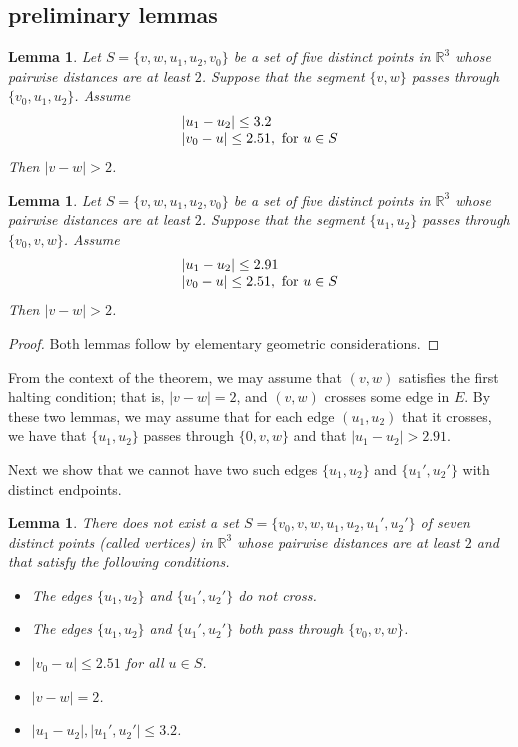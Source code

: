 \documentclass[11pt]{amsart}
\newcommand{\ring}[1]{\mathbb{#1}}
\def\text{\hbox}
\newtheorem{lemma}[subsubsection]{Lemma}
\begin{document}
\subsection*{preliminary lemmas}

\begin{lemma}  Let $S=\{v,w,u_1,u_2,v_0\}$ be a set of five distinct points in $\ring{R}^3$ whose
pairwise distances are at least $2$. Suppose that the segment $\{v,w\}$ passes through
$\{v_0,u_1,u_2\}$. Assume
$$
\begin{array}{lll}
|u_1-u_2|\le 3.2\\
|v_0-u|\le 2.51,\text{ for } u \in S\\
\end{array}
$$
Then $|v-w|>2$.
\end{lemma}

\begin{lemma}  Let $S=\{v,w,u_1,u_2,v_0\}$ be a set of five distinct points in $\ring{R}^3$ whose
pairwise distances are at least $2$. Suppose that the segment $\{u_1,u_2\}$ passes through
$\{v_0,v,w\}$. Assume
$$
\begin{array}{lll}
|u_1-u_2|\le 2.91\\
|v_0-u|\le 2.51,\text{ for } u \in S\\
\end{array}
$$
Then $|v-w|>2$.
\end{lemma}



\begin{proof} Both lemmas follow by elementary geometric considerations.
\end{proof}

From the context of the theorem, we may assume that $(v,w)$ satisfies the first halting condition;
that is, $|v-w|=2$, and $(v,w)$ crosses some edge in $E$.
By these two lemmas, we may assume that for each edge $(u_1,u_2)$ that it crosses,
we have that $\{u_1,u_2\}$ passes through $\{0,v,w\}$ and that $|u_1-u_2|>2.91$.

Next we show that we cannot have two such edges $\{u_1,u_2\}$ and $\{u_1',u_2'\}$ with distinct endpoints.

\begin{lemma} There does not exist a set $S=\{v_0,v,w,u_1,u_2,u_1',u_2'\}$ of seven distinct points (called vertices)
in $\ring{R}^3$ whose pairwise distances are at least $2$ and that satisfy the following conditions.
\begin{itemize}
\item The edges $\{u_1,u_2\}$ and $\{u_1',u_2'\}$ do not cross.
\item The edges $\{u_1,u_2\}$ and $\{u_1',u_2'\}$ both pass through $\{v_0,v,w\}$.
\item $|v_0-u|\le 2.51$ for all $u\in S$.
\item $|v-w|=2$.
\item $|u_1-u_2|,|u_1',u_2'|\le 3.2$.
\end{itemize}
\end{lemma}
\end{document}
